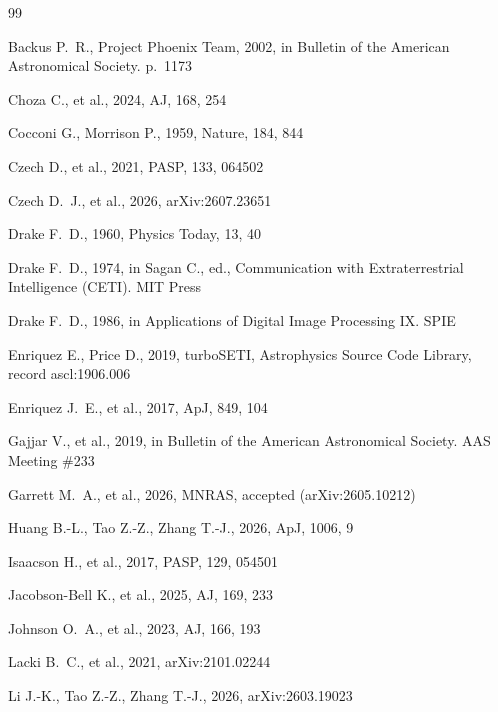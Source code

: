 \documentclass{openjournal}
\begin{document}
\begin{thebibliography}{99}

 Backus P.~R., Project Phoenix Team, 2002, in Bulletin of the American Astronomical Society. p.\ 1173

 Choza C., et al., 2024, AJ, 168, 254

 Cocconi G., Morrison P., 1959, Nature, 184, 844

 Czech D., et al., 2021, PASP, 133, 064502

 Czech D.~J., et al., 2026, arXiv:2607.23651

 Drake F.~D., 1960, Physics Today, 13, 40

 Drake F.~D., 1974, in Sagan C., ed., Communication with Extraterrestrial Intelligence (CETI). MIT Press

 Drake F.~D., 1986, in Applications of Digital Image Processing IX. SPIE

 Enriquez E., Price D., 2019, turboSETI, Astrophysics Source Code Library, record ascl:1906.006

 Enriquez J.~E., et al., 2017, ApJ, 849, 104

 Gajjar V., et al., 2019, in Bulletin of the American Astronomical Society. AAS Meeting \#233

 Garrett M.~A., et al., 2026, MNRAS, accepted (arXiv:2605.10212)

 Huang B.-L., Tao Z.-Z., Zhang T.-J., 2026, ApJ, 1006, 9

 Isaacson H., et al., 2017, PASP, 129, 054501

 Jacobson-Bell K., et al., 2025, AJ, 169, 233

 Johnson O.~A., et al., 2023, AJ, 166, 193

 Lacki B.~C., et al., 2021, arXiv:2101.02244

 Li J.-K., Tao Z.-Z., Zhang T.-J., 2026, arXiv:2603.19023


\end{thebibliography}
\end{document}
